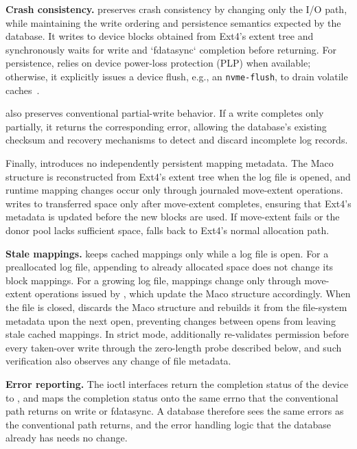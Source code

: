 {\bf Crash consistency.} \odes preserves crash consistency by changing only the I/O path, while maintaining the write ordering and persistence semantics expected by the database. It writes to device blocks obtained from Ext4's extent tree and synchronously waits for write and `fdatasync` completion before returning.
For persistence, \odes relies on device power-loss protection (PLP) when available; otherwise, it explicitly issues a device flush, e.g., an {\tt nvme-flush}, to drain volatile caches~\cite{fsync:bio-flags}.

\odes also preserves conventional partial-write behavior. If a write completes only partially, it returns the corresponding error, allowing the database's existing checksum and recovery mechanisms to detect and discard incomplete log records.

Finally, \odes introduces no independently persistent mapping metadata. The Maco structure is reconstructed from Ext4's extent tree when the log file is opened, and runtime mapping changes occur only through journaled move-extent operations. \odes writes to transferred space only after move-extent completes, ensuring that Ext4's metadata is updated before the new blocks are used. If move-extent fails or the donor pool lacks sufficient space, \odes falls back to Ext4's normal allocation path.

{\bf Stale mappings.}  \odes keeps cached mappings only while a log file is open. For a preallocated log file, appending to already allocated space does not change its block mappings. For a growing log file, mappings change only through move-extent operations issued by \odes, which update the Maco structure accordingly. When the file is closed, \odes discards the Maco structure and rebuilds it from the file-system metadata upon the next open, preventing changes between opens from leaving stale cached mappings. In strict mode, \odes additionally re-validates permission before every taken-over write through the zero-length probe described below, and such verification also observes any change of file metadata.

{\bf Error reporting.} The ioctl interfaces return the completion status of the
device to \odes, and \odes maps the completion status onto the same errno that the
conventional path returns on write or fdatasync. A database therefore sees the same
errors as the conventional path returns, and the error handling logic that the
database already has needs no change.


